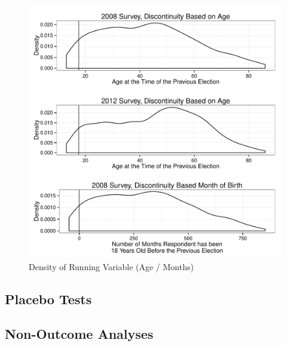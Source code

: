\documentclass[12pt]{article}
\begin{document}
\begin{figure}[ht]\centering
\includegraphics[scale=.5]{../calc/fig/rd2_density.pdf}
\caption{Density of Running Variable (Age / Months)}\label{fig:rd2_density}
\end{figure}

\clearpage
\subsection{Placebo Tests}




\clearpage
\subsection{Non-Outcome Analyses}




\clearpage


\end{document}
